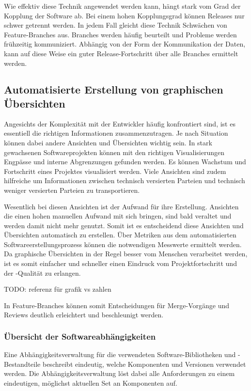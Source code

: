 Wie effektiv diese Technik angewendet werden kann, hängt stark vom Grad der Kopplung der Software ab. Bei einem hohen Kopplungsgrad können Releases nur schwer getrennt werden. In jedem Fall gleicht diese Technik Schwächen von Feature-Branches aus. Branches werden häufig beurteilt und Probleme werden frühzeitig kommuniziert. Abhängig von der Form der Kommunikation der Daten, kann auf diese Weise ein guter Release-Fortschritt über alle Branches ermittelt werden. 

\subsection{Automatisierte Erstellung von graphischen Übersichten}

Angesichts der Komplexität mit der Entwickler häufig konfrontiert sind, ist es essentiell die richtigen Informationen zusammenzutragen. Je nach Situation können dabei andere Ansichten und Übersichten wichtig sein. In stark gewachsenen Softwareprojekten können mit den richtigen Visualisierungen Engpässe und interne Abgrenzungen gefunden werden. Es können Wachstum und Fortschritt eines Projektes visualisiert werden. Viele Ansichten sind zudem hilfreiche um Informationen zwischen technisch versierten Parteien und technisch weniger versierten Parteien zu transportieren.

Wesentlich bei diesen Ansichten ist der Aufwand für ihre Erstellung. Ansichten die einen hohen manuellen Aufwand mit sich bringen, sind bald veraltet und werden damit nicht mehr genutzt. Somit ist es entscheidend diese Ansichten und Übersichten automatisch zu erstellen. Über Metriken aus dem automatisierten Softwareerstellungsprozess können die notwendigen Messwerte ermittelt werden. Da graphische Übersichten in der Regel besser vom Menschen verarbeitet werden, ist es somit einfacher und schneller einen Eindruck vom Projektfortschritt und der -Qualität zu erlangen.

TODO: referenz für grafik vs zahlen

In Feature-Branches können somit Entscheidungen für Merge-Vorgänge und Reviews deutlich erleichtert und beschleunigt werden.

\subsubsection{Übersicht der Softwareabhängigkeiten} 

Eine Abhängigkeitsverwaltung für die verwendeten Software-Bibliotheken und -Bestandteile beschreibt eindeutig, welche Komponenten und Versionen verwendet werden. Die Abhängigkeitsverwaltung löst dabei alle Anforderungen zu einem eindeutigen, möglichst aktuellen Set an Komponenten auf.

